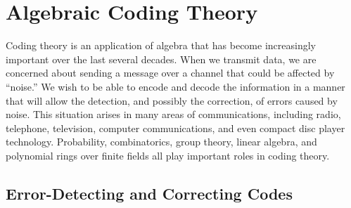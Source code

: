 \chapter{Algebraic Coding Theory}
 
 
 
Coding theory is an application of algebra that has become
increasingly important over the last several decades. When we transmit
data, we are concerned about sending a message over a channel that
could be affected by ``noise.'' We wish to be able to encode and
decode the information in a manner that will allow the detection, and
possibly the correction, of errors caused by noise. This situation
arises in many areas of communications, including radio, telephone,
television, computer communications, and even compact disc player
technology. Probability, combinatorics, group theory, linear algebra,
and polynomial rings over finite fields all play important roles in
coding theory.  
 
 
 
\section{Error-Detecting and Correcting Codes}
 
